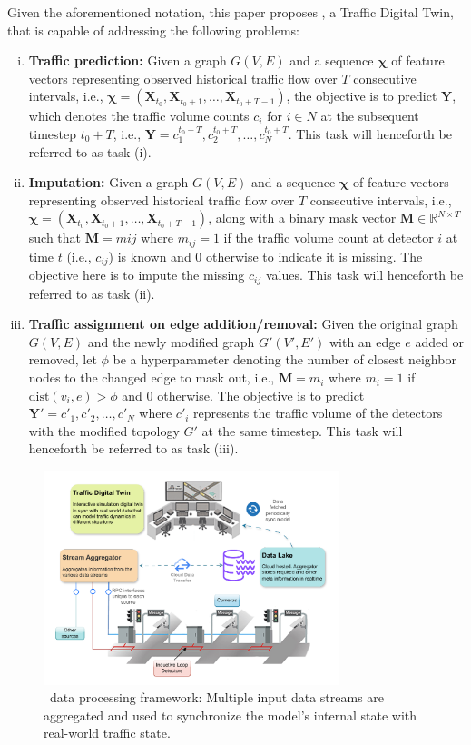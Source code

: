 Given the aforementioned notation, this paper proposes \name, a Traffic Digital Twin, that is capable of addressing the following problems:
\begin{enumerate}[(i)]
    \item \textbf{Traffic prediction:} Given a graph $G(V, E)$ and a sequence $\bm{\chi}$ of feature vectors representing observed historical traffic flow over $T$ consecutive intervals, i.e., $\bm{\chi} = (\mathbf{X}_{t_0}, \mathbf{X}_{t_0+1}, \ldots, \mathbf{X}_{t_0+T-1})$, the objective is to predict $\mathbf{Y}$, which denotes the traffic volume counts $c_i$ for $i \in N$ at the subsequent timestep $t_0+T$, i.e., $\mathbf{Y} = {c_1^{t_0+T}, c_2^{t_0+T}, \ldots, c_N^{t_0+T}}$. This task will henceforth be referred to as task (i).
    \item \textbf{Imputation:} Given a graph $G(V, E)$ and a sequence $\bm{\chi}$ of feature vectors representing observed historical traffic flow over $T$ consecutive intervals, i.e., $\bm{\chi} = (\mathbf{X}_{t_0}, \mathbf{X}_{t_0+1}, \ldots, \mathbf{X}_{t_0+T-1})$, along with a binary mask vector $\mathbf{M} \in \mathbb{R}^{N \times T}$ such that $\mathbf{M} = {m{ij}}$ where $m_{ij} = 1$ if the traffic volume count at detector $i$ at time $t$ (i.e., $c_{ij}$) is known and $0$ otherwise to indicate it is missing. The objective here is to impute the missing $c_{ij}$ values. This task will henceforth be referred to as task (ii).
    \item \textbf{Traffic assignment on edge addition/removal:} Given the original graph $G(V, E)$ and the newly modified graph $G'(V', E')$ with an edge $e$ added or removed, let $\phi$ be a hyperparameter denoting the number of closest neighbor nodes to the changed edge to mask out, i.e., $\mathbf{M} = {m_i}$ where $m_i = 1$ if $\text{dist}(v_i, e) > \phi$ and 0 otherwise. The objective is to predict $\mathbf{Y'} = {c'_1, c'_2, \ldots, c'_N}$ where $c'_i$ represents the traffic volume of the detectors with the modified topology $G'$ at the same timestep. This task will henceforth be referred to as task (iii).
\end{enumerate}
\begin{figure}[t]
  \centering
  \includegraphics[width=0.77\textwidth]{framework.pdf} %
  \caption{\name\ data processing framework: Multiple input data streams are aggregated and used to synchronize the model's internal state with real-world traffic state.}
  \label{fig:framework}
\end{figure}